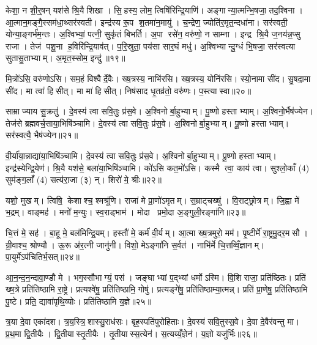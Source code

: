 केशा॒ न शी॒र्॒षन्‌ यश॑से श्रि॒यै शिखा। सि॒हस्य॒ लोम॒ त्विषि॑रिन्द्रि॒याणि॑। अङ्गान्या॒त्मन्भि॒षजा॒ तद॒श्विना। आ॒त्मान॒मङ्गै॒स्सम॑धा॒थ्सर॑स्वती। इन्द्र॑स्य रू॒प श॒तमा॑न॒मायु॑। च॒न्द्रेण॒ ज्योति॑र॒मृत॒न्दधा॑ना। सर॑स्वती॒ योन्या॒ङ्गर्भ॑म॒न्तः। अ॒श्विभ्यां॒ पत्नी॒ सुकृ॑तं बिभर्ति। अ॒पा रसे॑न॒ वरु॑णो॒ न साम्ना। इन्द्र श्रि॒यै ज॒नय॑न्न॒प्सु राजा। तेज॑ पशू॒ना ह॒विरि॑न्द्रि॒याव॑त्। प॒रि॒स्रुता॒ पय॑सा सार॒घं मधु॑। अ॒श्विभ्यान्दु॒ग्धं भि॒षजा॒ सर॑स्वत्या सुतासु॒ताभ्याम्। अ॒मृत॒स्सोम॒ इन्दु॑॥१९॥\anuvakamend[अन्त॑र आ॒राद॒न्तर्व॑साते व्याघ्रलो॒म राजा॑ च॒त्वारि॑ च]

मि॒त्रो॑ऽसि॒ वरु॑णोऽसि। सम॒हं विश्वैर्दे॒वैः। ख्ष॒त्रस्य॒ नाभि॑रसि। ख्ष॒त्रस्य॒ योनि॑रसि। स्यो॒नामा सी॑द। सु॒षदा॒मा सी॑द। मा त्वा॑ हिसीत्। मा मा॑ हिसीत्। निष॑साद धृ॒तव्र॑तो॒ वरु॑णः। प॒स्त्यास्वा॥२०॥

साम्राज्याय सु॒क्रतु॑। दे॒वस्य॑ त्वा सवि॒तुः प्र॑स॒वे। अ॒श्विनोर्बा॒हुभ्याम्। पू॒ष्णो हस्ताभ्याम्। अ॒श्विनो॒र्भैष॑ज्येन। तेज॑से ब्रह्मवर्च॒साया॒भिषि॑ञ्चामि। दे॒वस्य॑ त्वा सवि॒तुः प्र॑स॒वे। अ॒श्विनोर्बा॒हुभ्याम्। पू॒ष्णो हस्ताभ्याम्। सर॑स्वत्यै॒ भैष॑ज्येन॥२१॥

वी॒र्या॑या॒न्नाद्या॑या॒भिषि॑ञ्चामि। दे॒वस्य॑ त्वा सवि॒तुः प्र॑स॒वे। अ॒श्विनोर्बा॒हुभ्याम्। पू॒ष्णो हस्ताभ्याम्। इन्द्र॑स्येन्द्रि॒येण॑। श्रि॒यै यश॑से॒ बला॑या॒भिषि॑ञ्चामि। को॑ऽसि कत॒मो॑ऽसि। कस्मै त्वा॒ काय॑ त्वा। सुश्लो॒काँ (4) सुम॑ङ्ग॒लाँ (4) सत्य॑रा॒जा (३) न्। शिरो॑ मे॒ श्रीः॥२२॥

यशो॒ मुखम्। त्विषि॒ केशाश्च॒ श्मश्रू॑णि। राजा॑ मे प्रा॒णो॑ऽमृतम्। स॒म्राट्चख्षु॑। वि॒राट्छ्रोत्रम्। जि॒ह्वा मे॑ भ॒द्रम्। वाङ्मह॑। मनो॑ म॒न्युः। स्व॒राड्भाम॑। मोदा प्रमो॒दा अ॒ङ्गुली॒रङ्गा॑नि॥२३॥

चि॒त्तं मे॒ सह॑। बा॒हू मे॒ बल॑मिन्द्रि॒यम्। हस्तौ॑ मे॒ कर्म॑ वी॒र्यम्। आ॒त्मा ख्ष॒त्रमुरो॒ मम॑। पृ॒ष्टीर्मे॑ रा॒ष्ट्रमु॒दर॒मसौ। ग्री॒वाश्च॒ श्रोण्यौ। ऊ॒रू अ॑र॒त्नी जानु॑नी। विशो॒ मेऽङ्गा॑नि स॒र्वत॑। नाभि॑र्मे चि॒त्तव्विँ॒ज्ञानम्। पा॒युर्मेऽप॑चितिर्भ॒सत्॥२४॥

आ॒न॒न्द॒न॒न्दावा॒ण्डौ मे। भग॒स्सौभाग्यं॒ पस॑। जङ्घाभ्यां प॒द्भ्यां धर्मोऽस्मि। वि॒शि राजा॒ प्रति॑ष्ठितः। प्रति॑ ख्ष॒त्रे प्रति॑तिष्ठामि रा॒ष्ट्रे। प्रत्यश्वे॑षु॒ प्रति॑तिष्ठामि॒ गोषु॑। प्रत्यङ्गे॑षु॒ प्रति॑तिष्ठाम्या॒त्मन्न्। प्रति॑ प्रा॒णेषु॒ प्रति॑तिष्ठामि पु॒ष्टे। प्रति॒ द्यावा॑पृथि॒व्योः। प्रति॑तिष्ठामि य॒ज्ञे॥२५॥

त्र॒या दे॒वा एका॑दश। त्र॒य॒स्त्रि॒शास्सु॒राध॑सः। बृह॒स्पति॑पुरोहिताः। दे॒वस्य॑ सवि॒तुस्स॒वे। दे॒वा दे॒वैर॑वन्तु मा। प्र॒थ॒मा द्वि॒तीयैः। द्वि॒तीयास्तृ॒तीयैः। तृ॒तीयास्स॒त्येन॑। स॒त्यय्यँ॒ज्ञेन॑। य॒ज्ञो यजु॑र्भिः॥२६॥

